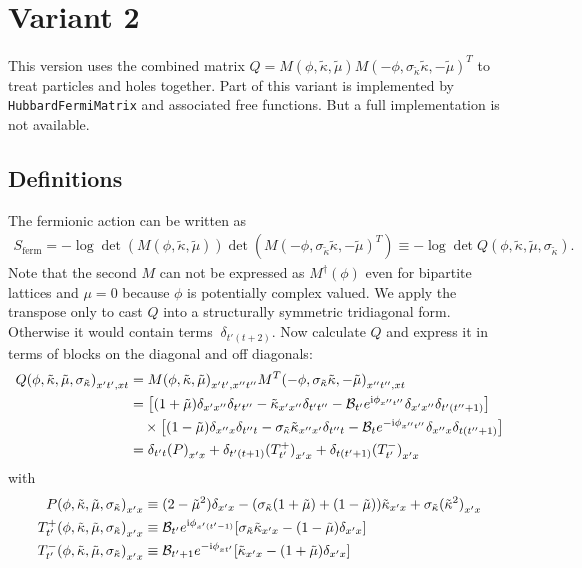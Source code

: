 \documentclass[a4paper, fleqn, twoside, notitlepage]{scrartcl}
\begin{document}
\clearpage
\section{Variant 2}

This version uses the combined matrix $Q = M(\phi, \tilde{\kappa}, \tilde{\mu}) {M(-\phi, \sigma_{\tilde{\kappa}}\tilde{\kappa}, -\tilde{\mu})}^T$ to treat particles and holes together.
Part of this variant is implemented by \texttt{HubbardFermiMatrix} and associated free functions. But a full implementation is not available.

\subsection{Definitions}

The fermionic action can be written as
\begin{align}
  S_\text{ferm} = - \log \det(M(\phi, \tilde{\kappa}, \tilde{\mu})) \det ({M(-\phi, \sigma_{\tilde{\kappa}}\tilde{\kappa}, -\tilde{\mu})}^T) \equiv - \log \det Q(\phi, \tilde{\kappa}, \tilde{\mu}, \sigma_{\tilde{\kappa}}).\label{eq:ferm_action_v2}
\end{align}
Note that the second $M$ can not be expressed as $M^\dagger(\phi)$ even for bipartite lattices and $\mu=0$ because $\phi$ is potentially complex valued. We apply the transpose only to cast $Q$ into a structurally symmetric tridiagonal form. Otherwise it would contain terms $~\delta_{t'(t+2)}$.
Now calculate $Q$ and express it in terms of blocks on the diagonal and off diagonals:
\begin{align}
  {Q(\phi, \tilde{\kappa}, \tilde{\mu}, \sigma_{\tilde{\kappa}})}_{x't',xt}
  &= {M(\phi, \tilde{\kappa}, \tilde{\mu})}_{x't',x''t''} {M^T(-\phi, \sigma_{\tilde{\kappa}}\tilde{\kappa}, -\tilde{\mu})}_{x''t'',xt}\\
  &= \big[(1+\tilde{\mu})\delta_{x'x''}\delta_{t't''} - \tilde{\kappa}_{x'x''}\delta_{t't''} - \mathcal{B}_{t'}e^{\mathrm{i}\phi_{x''t''}}\delta_{x'x''}\delta_{t'(t''+1)}\big] \nonumber\\
  &\quad\times \big[(1-\tilde{\mu})\delta_{x'' x}\delta_{t'' t} - \sigma_{\tilde{\kappa}}\tilde{\kappa}_{x'' x'}\delta_{t'' t} - \mathcal{B}_{t}e^{-\mathrm{i}\phi_{x''t''}}\delta_{x'' x}\delta_{t(t''+1)}\big]\\
  &= \delta_{t't}{(P)}_{x'x} + \delta_{t'(t+1)}{(T^+_{t'})}_{x'x} + \delta_{t(t'+1)}{(T^-_{t'})}_{x'x}
\end{align}
with
\begin{align}
  {P(\phi, \tilde{\kappa}, \tilde{\mu}, \sigma_{\tilde{\kappa}})}_{x'x} &\equiv (2-\tilde{\mu}^2)\delta_{x'x} - (\sigma_{\tilde{\kappa}}(1+\tilde{\mu}) + (1-\tilde{\mu}))\tilde{\kappa}_{x'x} + \sigma_{\tilde{\kappa}}{(\tilde{\kappa}^2)}_{x'x}\\
  {T^+_{t'}(\phi, \tilde{\kappa}, \tilde{\mu}, \sigma_{\tilde{\kappa}})}_{x'x} &\equiv \mathcal{B}_{t'}e^{\mathrm{i}\phi_{x'(t'-1)}}[\sigma_{\tilde{\kappa}}\tilde{\kappa}_{x'x} - (1-\tilde{\mu})\delta_{x'x}]\\
  {T^-_{t'}(\phi, \tilde{\kappa}, \tilde{\mu}, \sigma_{\tilde{\kappa}})}_{x'x} &\equiv \mathcal{B}_{t'+1}e^{-\mathrm{i}\phi_{xt'}}[\tilde{\kappa}_{x'x} - (1+\tilde{\mu})\delta_{x'x}]
\end{align}
\end{document}
